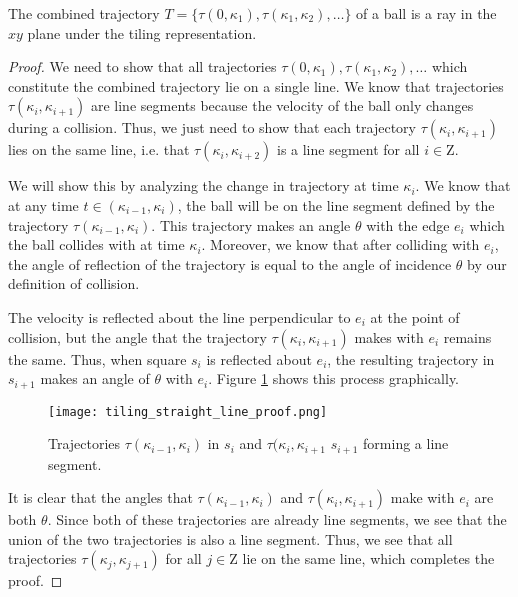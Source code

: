 \begin{theorem}
  The combined trajectory $T = \{\tau(0, \kappa_1), \tau(\kappa_1, \kappa_2), \ldots\}$ of a ball is a ray in the $xy$ plane under the tiling representation.
  \label{theorem:straight-line}
\end{theorem}
\begin{proof}
  We need to show that all trajectories $\tau(0, \kappa_1), \tau(\kappa_1, \kappa_2), \ldots$ which constitute the combined trajectory lie on a single line. We know that trajectories $\tau(\kappa_i, \kappa_{i+1})$ are line segments because the velocity of the ball only changes during a collision. Thus, we just need to show that each trajectory $\tau(\kappa_i, \kappa_{i+1})$ lies on the same line, i.e. that $\tau(\kappa_i, \kappa_{i+2})$ is a line segment for all $i \in \mathrm{Z}$.

  We will show this by analyzing the change in trajectory at time $\kappa_i$. We know that at any time $t \in (\kappa_{i-1}, \kappa_i)$, the ball will be on the line segment defined by the trajectory $\tau(\kappa_{i-1}, \kappa_i)$. This trajectory makes an angle $\theta$ with the edge $e_i$ which the ball collides with at time $\kappa_i$. Moreover, we know that after colliding with $e_i$, the angle of reflection of the trajectory is equal to the angle of incidence $\theta$ by our definition of collision.

The velocity is reflected about the line perpendicular to $e_i$ at the point of collision, but the angle that the trajectory $\tau(\kappa_i, \kappa_{i+1})$ makes with $e_i$ remains the same. Thus, when square $s_{i}$ is reflected about $e_i$, the resulting trajectory in $s_{i+1}$ makes an angle of $\theta$ with $e_i$. Figure \ref{fig:straight-line-angle} shows this process graphically.

\begin{figure}[H]
  \begin{center}
    \texttt{[image: tiling\_straight\_line\_proof.png]}
  \end{center}
  \vspace{-.2in} %
  \caption{\label{fig:straight-line-angle}Trajectories $\tau(\kappa_{i-1}, \kappa_i)$ in $s_i$ and $\tau(\kappa_{i}, \kappa_{i+1}$ $s_{i+1}$ forming a line segment.}
\end{figure}

It is clear that the angles that $\tau(\kappa_{i-1}, \kappa_i)$ and $\tau(\kappa_{i}, \kappa_{i+1})$ make with $e_i$ are both $\theta$. Since both of these trajectories are already line segments, we see that the union of the two trajectories is also a line segment. Thus, we see that all trajectories $\tau(\kappa_j, \kappa_{j+1})$ for all $j \in \mathrm{Z}$ lie on the same line, which completes the proof.
\end{proof}

